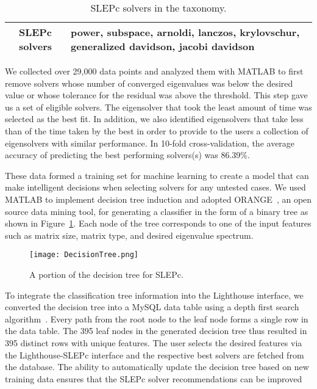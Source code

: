 \documentclass{sig-alternate}
\begin{document}
\begin{table}[!htbp]
\centering
\caption{SLEPc solvers in the taxonomy.}
\label{table_solvers}
\begin{tabular}{|c|p{5.3cm}|}
\hline
\textbf{SLEPc solvers} & power, subspace, arnoldi, lanczos, krylovschur, generalized davidson, jacobi davidson\\ \hline
\end{tabular}
\end{table}

We collected over 29,000 data points and analyzed them with MATLAB to first remove solvers 
whose number of converged 
eigenvalues was below the
desired value or whose tolerance for the residual was above the threshold. This step gave us a set of eligible solvers. The eigensolver that
took the least amount of time was selected as the best fit. In addition, 
we also identified eigensolvers that take less than  of the time taken by the best in order
to provide to the users a collection of eigensolvers with similar performance. In 10-fold cross-validation, the average accuracy 
of predicting the best performing solvers(s) was 86.39\%.



These data formed a training set for machine learning to create a model that can 
make intelligent decisions when selecting solvers for
any untested cases. We used MATLAB to implement decision tree induction and adopted ORANGE~\cite{orange:Online},
an open source data mining tool, for generating a classifier in the form of a binary tree as shown in Figure~\ref{fig:DecisionTree}.
Each node of the tree corresponds to one of the input features such as matrix size, matrix type, and desired eigenvalue spectrum.

\begin{figure}[ht]
\centering
\texttt{[image: DecisionTree.png]}
\vspace{-5pt}
\caption{A portion of the decision tree for SLEPc.}
\label{fig:DecisionTree}
\end{figure}


To integrate the classification tree information into the Lighthouse interface, we converted the decision tree into a MySQL 
data table using a depth first search algorithm~\cite{Skiena:1997}. Every path from the root node to the leaf node forms a 
single row in the data table. The 395 leaf nodes in the generated
decision tree thus resulted in 395 distinct rows with unique features. 
The user selects the desired features via the Lighthouse-SLEPc interface and the respective best solvers are fetched from the database.
The ability to automatically update the decision tree based on new training data ensures that the SLEPc 
solver recommendations can be improved  
\end{document}
